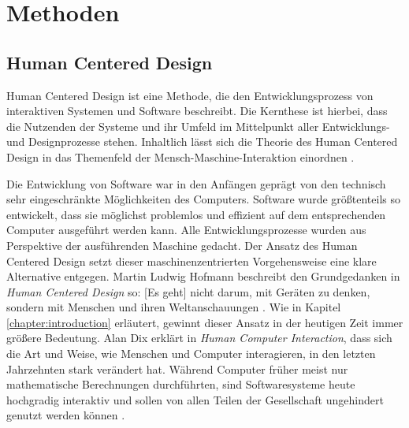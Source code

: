 \chapter{Methoden}
\label{chapter:methods}

\section{Human Centered Design}
Human Centered Design ist eine Methode, die den Entwicklungsprozess von
interaktiven Systemen und Software beschreibt. Die Kernthese ist hierbei, dass
die Nutzenden der Systeme und ihr Umfeld im Mittelpunkt aller Entwicklungs\hyphen\space und
Designprozesse stehen. Inhaltlich lässt sich die Theorie des Human Centered
Design in das Themenfeld der Mensch-Maschine-Interaktion
einordnen \cite{HMI-HCD}.

Die Entwicklung von Software war in den Anfängen geprägt von den technisch sehr
eingeschränkte Möglichkeiten des Computers. Software wurde größtenteils so
entwickelt, dass sie möglichst problemlos und effizient auf dem entsprechenden
Computer ausgeführt werden kann. Alle Entwicklungsprozesse wurden aus
Perspektive der ausführenden Maschine gedacht. Der Ansatz des Human Centered
Design setzt dieser maschinenzentrierten Vorgehensweise eine klare Alternative
entgegen. Martin Ludwig Hofmann beschreibt den Grundgedanken in \textit{Human
    Centered Design} so: \glqq{}[Es geht] nicht darum, mit Geräten zu denken,
sondern mit Menschen und ihren Weltanschauungen\grqq{} \cite{hcd}. Wie in
Kapitel \ref{chapter:introduction} erläutert, gewinnt dieser Ansatz in der
heutigen Zeit immer größere Bedeutung. Alan Dix erklärt in \textit{Human Computer
    Interaction}, dass sich die Art und Weise, wie Menschen und Computer
interagieren, in den letzten Jahrzehnten stark verändert hat. Während Computer
früher meist nur mathematische Berechnungen durchführten, sind Softwaresysteme
heute hochgradig interaktiv und sollen von allen Teilen der Gesellschaft
ungehindert genutzt werden können \cite{hci}.

